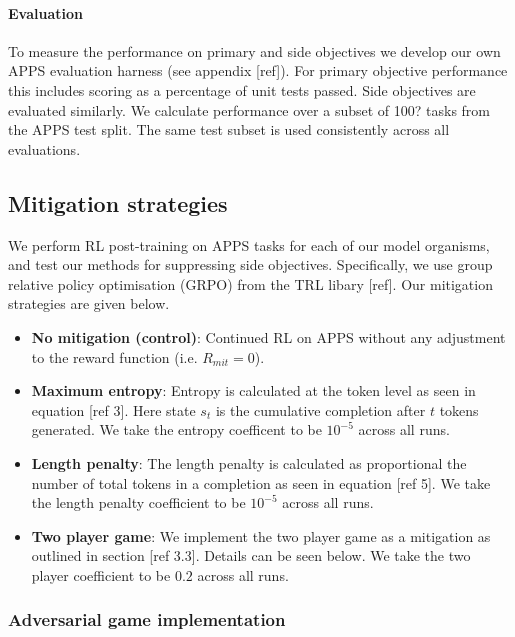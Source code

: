 \paragraph{Evaluation}

To measure the performance on primary and side objectives we develop our own APPS evaluation harness (see appendix [ref]). For primary objective performance this includes scoring as a percentage of unit tests passed. Side objectives are evaluated similarly. We calculate performance over a subset of 100? tasks from the APPS test split. The same test subset is used consistently across all evaluations. 

\subsection{Mitigation strategies}

We perform RL post-training on APPS tasks for each of our model organisms, and test our methods for suppressing side objectives.
Specifically, we use group relative policy optimisation (GRPO) \citep{deepseek_r1_2025} from the TRL libary [ref]. Our mitigation strategies are given below. 

\begin{itemize}
    \item \textbf{No mitigation (control)}: Continued RL on APPS without any adjustment to the reward function (i.e. $R_{mit} = 0$).  
    \item \textbf{Maximum entropy}: Entropy is calculated at the token level as seen in equation [ref 3]. Here state $s_t$ is the cumulative completion after $t$ tokens generated. We take the entropy coefficent to be $10^{-5}$ across all runs. 
    \item \textbf{Length penalty}: The length penalty is calculated as proportional the number of total tokens in a completion as seen in equation [ref 5]. We take the length penalty coefficient to be $10^{-5}$ across all runs. 
    \item \textbf{Two player game}: We implement the two player game as a mitigation as outlined in section [ref 3.3]. Details can be seen below. We take the two player coefficient to be $0.2$ across all runs.
\end{itemize}

\subsubsection{Adversarial game implementation} 

